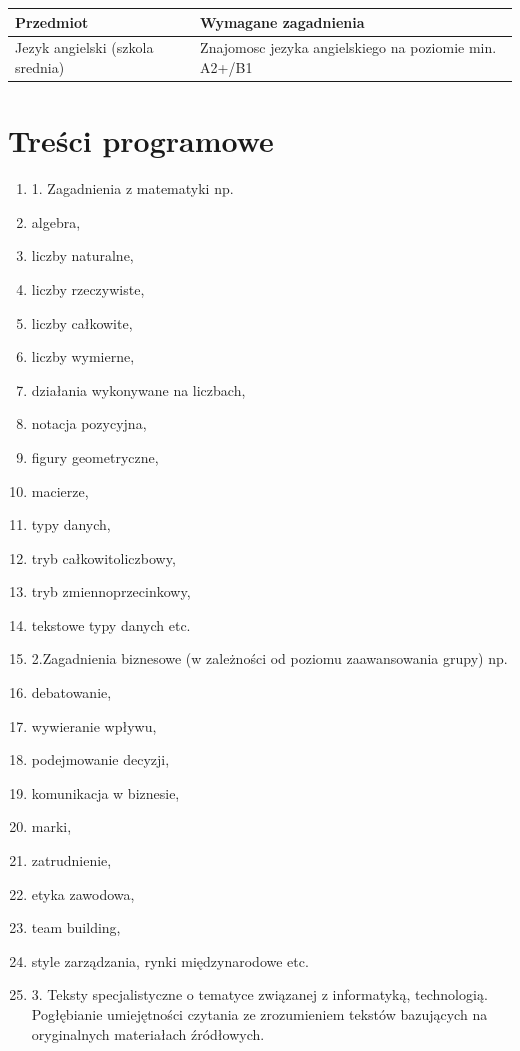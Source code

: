\documentclass[12pt, a4paper]{article}
\begin{document}
\begin{tabularx}{\textwidth}{lX}
  \hline
  \textbf{Przedmiot} & \textbf{Wymagane zagadnienia} \\
  \hline
  Jezyk angielski (szkola srednia) & Znajomosc jezyka angielskiego na poziomie min. A2+/B1 \\
  \hline
\end{tabularx}

\section{Treści programowe}

\begin{enumerate}
  \item 1. Zagadnienia z matematyki np.
  \item algebra,
  \item liczby naturalne,
  \item liczby rzeczywiste,
  \item liczby całkowite,
  \item liczby wymierne,
  \item działania wykonywane na liczbach,
  \item notacja pozycyjna,
  \item figury geometryczne,
  \item macierze,
  \item typy danych,
  \item tryb całkowitoliczbowy,
  \item tryb zmiennoprzecinkowy,
  \item tekstowe typy danych etc.
  \item 2.Zagadnienia biznesowe (w zależności od poziomu zaawansowania grupy) np.
  \item debatowanie,
  \item wywieranie wpływu,
  \item podejmowanie decyzji,
  \item komunikacja w biznesie,
  \item marki,
  \item zatrudnienie,
  \item etyka zawodowa,
  \item team building,
  \item style zarządzania,  rynki międzynarodowe etc.
  \item 3. Teksty specjalistyczne o tematyce związanej z informatyką, technologią.  Pogłębianie umiejętności czytania ze zrozumieniem tekstów bazujących na oryginalnych materiałach źródłowych.

\end{enumerate}
\end{document}
